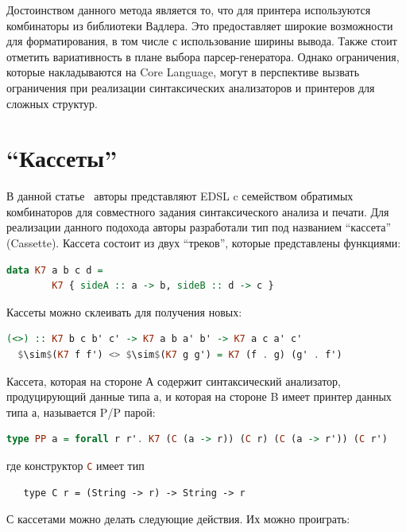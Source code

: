 Достоинством данного метода является то, что для принтера используются комбинаторы из библиотеки Вадлера. 
Это предоставляет широкие возможности для форматирования, в том числе с использование ширины вывода. 
Также стоит отметить вариативность в плане выбора парсер-генератора. Однако ограничения, которые
накладываются на Core Language, могут в перспективе вызвать ограничения при реализации 
синтаксических анализаторов и принтеров для сложных структур.

\section{``Кассеты''}

В данной статье~\cite{Boespflug} авторы представляют EDSL c семейством обратимых комбинаторов для совместного 
задания синтаксического анализа и печати. Для реализации данного подохода авторы разработали 
тип под названием ``кассета'' (Cassette). Кассета состоит из двух ``треков'', которые представлены функциями:

\begin{lstlisting}[mathescape,language=Haskell]
   data K7 a b c d = 
        K7 { sideA :: a -> b, sideB :: d -> c }
\end{lstlisting}

Кассеты можно склеивать для получения новых:

\begin{lstlisting}[mathescape,language=Haskell]
  (<>) :: K7 b c b' c' -> K7 a b a' b' -> K7 a c a' c'
  $\sim$(K7 f f') <> $\sim$(K7 g g') = K7 (f . g) (g' . f')
\end{lstlisting}

Кассета, которая на стороне А содержит синтаксический анализатор, продуцирующий данные типа $а$, и которая
на стороне B имеет принтер данных типа $а$, называется P/P парой:

\begin{lstlisting}[mathescape,language=Haskell]
  type PP a = forall r r'. K7 (C (a -> r)) (C r) (C (a -> r')) (C r')
\end{lstlisting}

\noindent где конструктор \lstinline[language=Haskell]{C} имеет тип 

\begin{lstlisting}
   type C r = (String -> r) -> String -> r
\end{lstlisting}

С кассетами можно делать следующие действия. Их можно проиграть:

